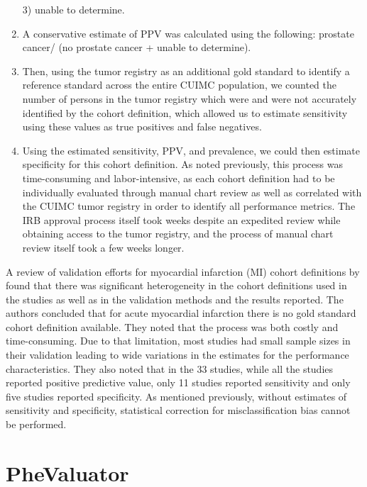 \documentclass[11pt]{book}
\theoremstyle{definition}
\theoremstyle{definition}
\theoremstyle{definition}
\theoremstyle{remark}
\begin{document}
\begin{enumerate}
  3) unable to determine.
\item
  A conservative estimate of PPV was calculated using the following:
  prostate cancer/ (no prostate cancer + unable to determine).
\item
  Then, using the tumor registry as an additional gold standard to
  identify a reference standard across the entire CUIMC population, we
  counted the number of persons in the tumor registry which were and
  were not accurately identified by the cohort definition, which allowed
  us to estimate sensitivity using these values as true positives and
  false negatives.
\item
  Using the estimated sensitivity, PPV, and prevalence, we could then
  estimate specificity for this cohort definition. As noted previously,
  this process was time-consuming and labor-intensive, as each cohort
  definition had to be individually evaluated through manual chart
  review as well as correlated with the CUIMC tumor registry in order to
  identify all performance metrics. The IRB approval process itself took
  weeks despite an expedited review while obtaining access to the tumor
  registry, and the process of manual chart review itself took a few
  weeks longer.
\end{enumerate}

A review of validation efforts for myocardial infarction (MI) cohort
definitions by \citet{Rubbo2015phenotypes} found that there was
significant heterogeneity in the cohort definitions used in the studies
as well as in the validation methods and the results reported. The
authors concluded that for acute myocardial infarction there is no gold
standard cohort definition available. They noted that the process was
both costly and time-consuming. Due to that limitation, most studies had
small sample sizes in their validation leading to wide variations in the
estimates for the performance characteristics. They also noted that in
the 33 studies, while all the studies reported positive predictive
value, only 11 studies reported sensitivity and only five studies
reported specificity. As mentioned previously, without estimates of
sensitivity and specificity, statistical correction for
misclassification bias cannot be performed.

\section{PheValuator}\label{phevaluator}

\end{document}
